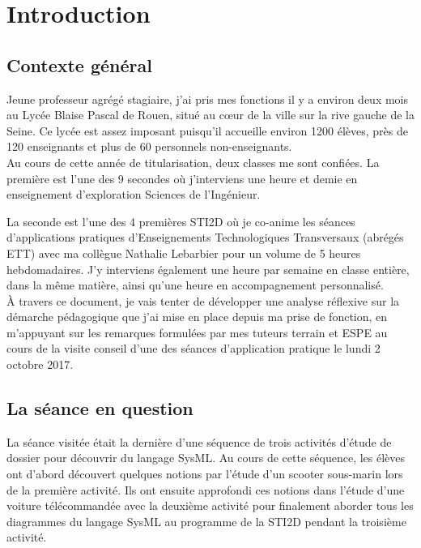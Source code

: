 \documentclass[pdftex,a4paper,12pt]{article}
\begin{document}
	
	\section{Introduction}
	\subsection{Contexte général}
	Jeune professeur agrégé stagiaire, j'ai pris mes fonctions il y a environ deux mois au Lycée Blaise Pascal de Rouen, 
	situé au c\oe{}ur de la ville sur la rive gauche de la Seine.
	Ce lycée est assez imposant puisqu'il accueille environ 1200 élèves, près de 120 enseignants et plus de 60 personnels non-enseignants.\\
	
	Au cours de cette année de titularisation, deux classes me sont confiées.
	La première est l'une des 9 secondes où j'interviens une heure et demie en enseignement d'exploration \og{}Sciences de l'Ingénieur\fg{}.

	La seconde est l'une des 4 premières STI2D où je co-anime les séances d'applications pratiques d'Enseignements Technologiques Transversaux (abrégés ETT) 
	avec ma collègue Nathalie Lebarbier pour un volume de 5 heures hebdomadaires.
	J'y interviens également une heure par semaine en classe entière, dans la même matière, ainsi qu'une heure en accompagnement personnalisé.\\

	À travers ce document, je vais tenter de développer une analyse réflexive sur la démarche pédagogique que j'ai mise en place depuis ma prise de fonction,
	en m'appuyant sur les remarques formulées par mes tuteurs terrain et ESPE au cours de la visite conseil 
	d'une des séances d'application pratique le lundi 2 octobre 2017.

	\subsection{La séance en question}
	La séance visitée était la dernière d'une séquence de trois activités d'étude de dossier pour découvrir du langage SysML.
	Au cours de cette séquence, les élèves ont d'abord découvert quelques notions par l'étude d'un scooter sous-marin lors de la première activité. 
	Ils ont ensuite approfondi ces notions dans l'étude d'une voiture télécommandée avec la deuxième activité
	pour finalement aborder tous les diagrammes du langage SysML au programme de la STI2D pendant la troisième activité.
\end{document}
